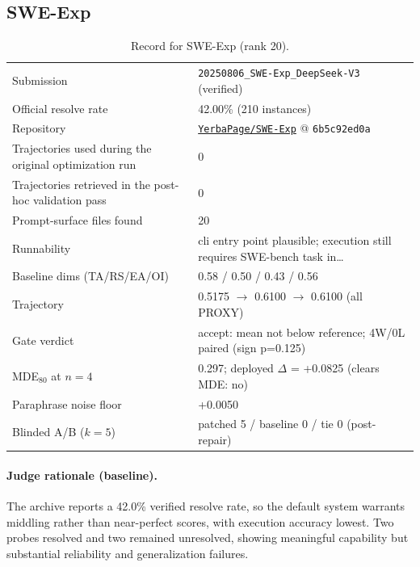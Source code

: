 \subsection{SWE-Exp}
\label{app:agent20}
\begin{table}[H]\centering\scriptsize
\caption{Record for SWE-Exp (rank 20).}
\begin{tabular}{lp{8.2cm}}\toprule
Submission & \texttt{20250806\_\allowbreak{}SWE-Exp\_\allowbreak{}DeepSeek-V3} (verified) \\
Official resolve rate & 42.00\% (210 instances) \\
Repository & \href{https://github.com/YerbaPage/SWE-Exp}{\texttt{YerbaPage/SWE-Exp}} @ \texttt{6b5c92ed0a} \\
Trajectories used during the original optimization run & 0 \\
Trajectories retrieved in the post-hoc validation pass & 0 \\
Prompt-surface files found & 20 \\
Runnability & cli entry point plausible; execution still requires SWE-bench task in\ldots{} \\
Baseline dims (TA/RS/EA/OI) & 0.58 / 0.50 / 0.43 / 0.56 \\
Trajectory & 0.5175 $\to$ 0.6100 $\to$ 0.6100 (all PROXY) \\
Gate verdict & accept: mean not below reference; 4W/0L paired (sign p=0.125) \\
MDE$_{80}$ at $n{=}4$ & 0.297; deployed $\Delta$ = +0.0825 (clears MDE: no) \\
Paraphrase noise floor & +0.0050 \\
Blinded A/B ($k{=}5$) & patched 5 / baseline 0 / tie 0 (post-repair) \\
\bottomrule\end{tabular}\end{table}
\paragraph{Judge rationale (baseline).}
The archive reports a 42.0\% verified resolve rate, so the default system warrants middling rather than near-perfect scores, with execution accuracy lowest. Two probes resolved and two remained unresolved, showing meaningful capability but substantial reliability and generalization failures.
